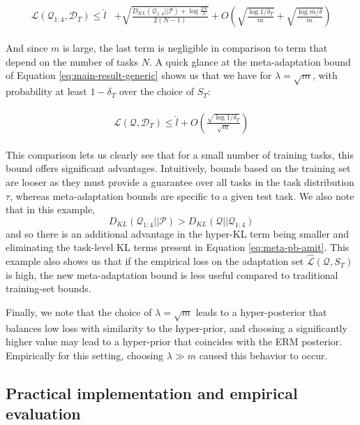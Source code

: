 \documentclass{article}
\theoremstyle{definition}
\begin{document}
\begin{align*}
\begin{split}
	\mathcal{L}(\mathcal{Q}_{1:4},\mathcal{D}_T)\leq \hat{l} &+ \sqrt{\frac{D_{KL}(\mathcal{Q}_{1:4}||\mathcal{P})+\log\frac{2N}{\delta}}{2(N-1)}}
	+O\left (\sqrt{\frac{\log{1/\delta_T}}{m}}+\sqrt{\frac{\log{m/\delta}}{m}}\right )
\end{split}
\end{align*}

And since $m$ is large, the last term is negligible in comparison to term that depend on the number of tasks $N$.
A quick glance at the meta-adaptation bound of Equation \ref{eq:main-result-generic} shows us that we have for $\lambda=\sqrt{m}$, with probability at least $1-\delta_T$ over the choice of $S_T$:

\begin{align*}
\begin{split}
\mathcal{L}(\mathcal{Q},\mathcal{D}_T)\leq \hat{l} + O\left (\frac{\sqrt{\log{1/\delta_T}}}{\sqrt{m}}\right ) 
\end{split}
\end{align*}

This comparison lets us clearly see that for a small number of training tasks, this bound offers significant advantages. Intuitively, bounds based on the training set are looser as they must provide a guarantee over all tasks in the task distribution $\tau$, whereas meta-adaptation bounds are specific to a given test task. We also note that in this example,  $$D_{KL}(\mathcal{Q}_{1:4}||\mathcal{P})>D_{KL}(\mathcal{Q}||\mathcal{Q}_{1:4})$$ 
and so there is an additional advantage in the hyper-KL term being smaller and eliminating the task-level KL terms present in Equation \ref{eq:meta-pb-amit}. This example also shows us that if the empirical loss on the adaptation set $\hat{\mathcal{L}}(\mathcal{Q}, S_T)$ is high, the new meta-adaptation bound is less useful compared to traditional training-set bounds. 

Finally, we note that the choice of $\lambda=\sqrt{m}$ leads to a hyper-posterior that balances low loss with similarity to the hyper-prior, and choosing a significantly higher value may lead to a hyper-prior that coincides with the ERM posterior. Empirically for this setting, choosing $\lambda\gg m$ caused this behavior to occur.

\subsection{Practical implementation and empirical evaluation}
\end{document}
